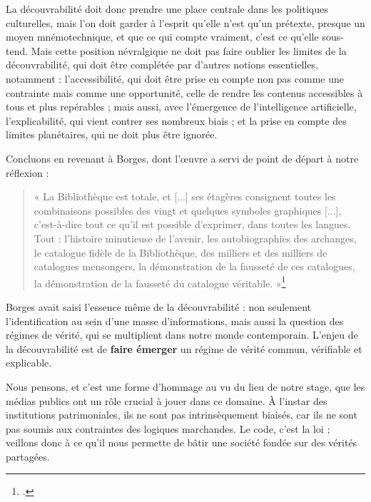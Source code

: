 \documentclass[a4paper,12pt,twoside]{book}
\begin{document}
	La découvrabilité doit donc prendre une place centrale dans les politiques culturelles, mais l’on doit garder à l’esprit qu’elle n’est qu’un prétexte, presque un moyen mnémotechnique, et que ce qui compte vraiment, c’est ce qu’elle sous-tend. Mais cette position névralgique ne doit pas faire oublier les limites de la découvrabilité, qui doit être complétée par d’autres notions essentielles, notamment : l’accessibilité, qui doit être prise en compte non pas comme une contrainte mais comme une opportunité, celle de rendre les contenus accessibles à tous et plus repérables ; mais aussi, avec l’émergence de l’intelligence artificielle, l’explicabilité, qui vient contrer ses nombreux biais ; et la prise en compte des limites planétaires, qui ne doit plus être ignorée.
	
	Concluons en revenant à Borges, dont l'œuvre a servi de point de départ à notre réflexion :
	
	\begin{quote} « La Bibliothèque est totale, et [...] ses étagères consignent toutes les combinaisons possibles des vingt et quelques symboles graphiques [...], c’est-à-dire tout ce qu’il est possible d’exprimer, dans toutes les langues. Tout : l’histoire minutieuse de l’avenir, les autobiographies des archanges, le catalogue fidèle de la Bibliothèque, des milliers et des milliers de catalogues mensongers, la démonstration de la fausseté de ces catalogues, la démonstration de la fausseté du catalogue véritable. »\footcite[p. 3]{borges1963} \end{quote}
	
	Borges avait saisi l'essence même de la découvrabilité : non seulement l'identification au sein d'une masse d'informations, mais aussi la question des régimes de vérité, qui se multiplient dans notre monde contemporain. L'enjeu de la découvrabilité est de \textbf{faire émerger} un régime de vérité commun, vérifiable et explicable.
	
	Nous pensons, et c'est une forme d'hommage au vu du lieu de notre stage, que les médias publics ont un rôle crucial à jouer dans ce domaine. À l'instar des institutions patrimoniales, ils ne sont pas intrinsèquement biaisés, car ils ne sont pas soumis aux contraintes des logiques marchandes. Le code, c'est la loi ; veillons donc à ce qu'il nous permette de bâtir une société fondée sur des vérités partagées.
	
	\newpage{\pagestyle{empty}\cleardoublepage}
	
	\renewcommand\indexname{Index thématique (grandes notions)} %
	
\end{document}
